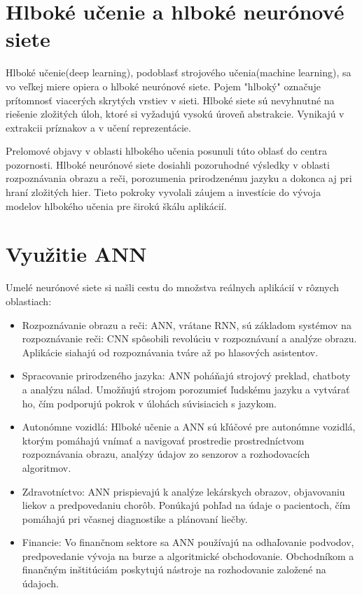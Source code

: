 \documentclass[10pt,twoside,slovak,a4paper]{article}
\begin{document}
\section{Hlboké učenie a hlboké neurónové siete} \label{nejaka}\cite{geron2017neural}
Hlboké učenie(deep learning), podoblasť strojového učenia(machine learning), sa vo veľkej miere opiera o hlboké neurónové siete. Pojem "hlboký" označuje prítomnosť viacerých skrytých vrstiev v sieti. Hlboké siete sú nevyhnutné na riešenie zložitých úloh, ktoré si vyžadujú vysokú úroveň abstrakcie. Vynikajú v extrakcii príznakov a v učení reprezentácie.
 
 
 
Prelomové objavy v oblasti hlbokého učenia posunuli túto oblasť do centra pozornosti. Hlboké neurónové siete dosiahli pozoruhodné výsledky v oblasti rozpoznávania obrazu a reči, porozumenia prirodzenému jazyku a dokonca aj pri hraní zložitých hier. Tieto pokroky vyvolali záujem a investície do vývoja modelov hlbokého učenia pre širokú škálu aplikácií.

\section{Využitie ANN} \label{nejaka} \cite{aws}
Umelé neurónové siete si našli cestu do množstva reálnych aplikácií v rôznych oblastiach:
 
\begin{itemize}
\item Rozpoznávanie obrazu a reči: ANN, vrátane RNN, sú základom systémov na rozpoznávanie reči: CNN spôsobili revolúciu v rozpoznávaní a analýze obrazu. Aplikácie siahajú od rozpoznávania tváre až po hlasových asistentov.
 \end{itemize}
 \begin{itemize}
\item Spracovanie prirodzeného jazyka: ANN poháňajú strojový preklad, chatboty a analýzu nálad. Umožňujú strojom porozumieť ľudskému jazyku a vytvárať ho, čím podporujú pokrok v úlohách súvisiacich s jazykom.
 \end{itemize}
 \begin{itemize}
\item Autonómne vozidlá: Hlboké učenie a ANN sú kľúčové pre autonómne vozidlá, ktorým pomáhajú vnímať a navigovať prostredie prostredníctvom rozpoznávania obrazu, analýzy údajov zo senzorov a rozhodovacích algoritmov.
 \end{itemize}
 \begin{itemize}
\item Zdravotníctvo: ANN prispievajú k analýze lekárskych obrazov, objavovaniu liekov a predpovedaniu chorôb. Ponúkajú pohľad na údaje o pacientoch, čím pomáhajú pri včasnej diagnostike a plánovaní liečby.
 \end{itemize}
\begin{itemize} 
\item Financie: Vo finančnom sektore sa ANN používajú na odhaľovanie podvodov, predpovedanie vývoja na burze a algoritmické obchodovanie. Obchodníkom a finančným inštitúciám poskytujú nástroje na rozhodovanie založené na údajoch.
\end{itemize}
 
\end{document}
